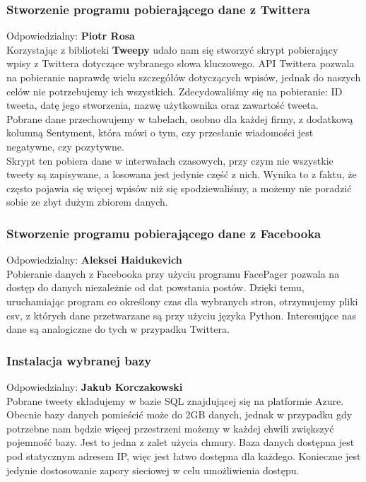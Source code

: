 \documentclass[a4paper,11pt, notitlepage ]{article}
\begin{document}
    \subsubsection{Stworzenie programu pobierającego dane z Twittera}
    Odpowiedzialny: \textbf{Piotr Rosa}\\
    Korzystając z biblioteki \textbf{Tweepy} udało nam się stworzyć skrypt pobierający wpisy z Twittera dotyczące wybranego słowa kluczowego. API Twittera pozwala na pobieranie naprawdę wielu szczegółów dotyczących wpisów, jednak do naszych celów nie potrzebujemy ich wszystkich. Zdecydowaliśmy się na pobieranie: ID tweeta, datę jego stworzenia, nazwę użytkownika oraz zawartość tweeta.\\
    Pobrane dane przechowujemy w tabelach, osobno dla każdej firmy, z dodatkową kolumną Sentyment, która mówi o tym, czy przesłanie wiadomości jest negatywne, czy pozytywne.\\
    Skrypt ten pobiera dane w interwałach czasowych, przy czym nie wszystkie tweety są zapisywane, a losowana jest jedynie część z nich. Wynika to z faktu, że często pojawia się więcej wpisów niż się spodziewaliśmy, a możemy nie poradzić sobie ze zbyt dużym zbiorem danych.
    \subsubsection{Stworzenie programu pobierającego dane z Facebooka}
    Odpowiedzialny: \textbf{Aleksei Haidukevich}\\
    Pobieranie danych z Facebooka przy użyciu programu FacePager pozwala na dostęp do danych niezależnie od dat powstania postów. Dzięki temu, uruchamiając program co określony czas dla wybranych stron, otrzymujemy pliki csv, z których dane przetwarzane są przy użyciu języka Python. Interesujące nas dane są analogiczne do tych w przypadku Twittera.
    \subsubsection{Instalacja wybranej bazy}
    Odpowiedzialny: \textbf{Jakub Korczakowski}\\
    Pobrane tweety składujemy w bazie SQL znajdującej się na platformie Azure. Obecnie bazy danych pomieścić może do 2GB danych, jednak w przypadku gdy potrzebne nam będzie więcej przestrzeni możemy w każdej chwili zwiększyć pojemność bazy. Jest to jedna z zalet użycia chmury. Baza danych dostępna jest pod statycznym adresem IP, więc jest łatwo dostępna dla każdego. Konieczne jest jedynie dostosowanie zapory sieciowej w celu umożliwienia dostępu.
\end{document}
